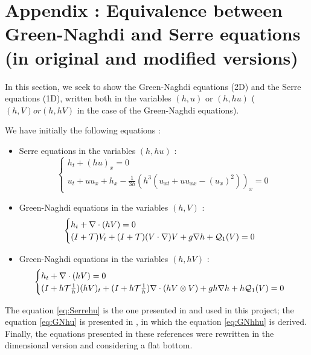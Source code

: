 \section{Appendix : Equivalence between Green-Naghdi and Serre equations (in original and modified versions)}

\indent In this section, we seek to show the Green-Naghdi equations (2D) and the Serre equations (1D), written both in the variables $(h,u)$ or $(h,hu)$ ($(h,V) or (h,hV)$ in the case of the Green-Naghdi equations).

\indent  We have initially the following equations : 

\begin{itemize}
	\item Serre equations in the variables $(h,hu)$ : 
	\begin{equation}
		\label{eq:Serrehu}
		\begin{cases}
			h_t + (hu)_x = 0 \\
			u_t + uu_x + h_x - \frac{1}{3h}\left(h^3 \left( u_{xt} + uu_{xx} - (u_x)^2  \right) \right)_x = 0
		\end{cases}
	\end{equation}
	\item Green-Naghdi equations in the variables $(h,V)$ : 
	\begin{equation}
		\label{eq:GNhu}
		\begin{cases}
			h_t + \nabla\cdot(hV) = 0 \\
			(I + \mathcal{T}) V_t  + (I + \mathcal{T})(V\cdot\nabla)V + g\nabla h + \mathcal{Q}_1(V) = 0
		\end{cases}
	\end{equation}
	\item Green-Naghdi equations in the variables $(h,hV)$ : 
	\begin{equation}
		\label{eq:GNhhu}
		\begin{cases}
			h_t + \nabla\cdot(hV) = 0 \\
			(I + h\mathcal{T}\frac{1}{h}) (hV)_t + (I + h\mathcal{T}\frac{1}{h})\nabla\cdot(hV \otimes V) + gh\nabla  h + h\mathcal{Q}_1(V) = 0
		\end{cases}
	\end{equation}
\end{itemize}

\indent The equation \eqref{eq:Serrehu} is the one presented in \cite{CarterCienfuegos2011} and used in this project; the equation \eqref{eq:GNhu} is presented in \cite{Bonneton2011}, in which the equation \eqref{eq:GNhhu} is derived. Finally, the equations presented in these references were rewritten in the dimensional version and considering a flat bottom.

